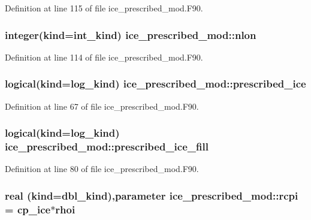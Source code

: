 Definition at line 115 of file ice\_\-prescribed\_\-mod.F90.\hypertarget{namespaceice__prescribed__mod_a7af5d49e5ab6fd7900aeb659387719a3}{
\subsubsection[{nlon}]{\setlength{\rightskip}{0pt plus 5cm}integer(kind=int\_\-kind) {\bf ice\_\-prescribed\_\-mod::nlon}}}
\label{namespaceice__prescribed__mod_a7af5d49e5ab6fd7900aeb659387719a3}


Definition at line 114 of file ice\_\-prescribed\_\-mod.F90.\hypertarget{namespaceice__prescribed__mod_a1b42a8c2b0357eb657332946d2b6c78a}{
\subsubsection[{prescribed\_\-ice}]{\setlength{\rightskip}{0pt plus 5cm}logical(kind=log\_\-kind) {\bf ice\_\-prescribed\_\-mod::prescribed\_\-ice}}}
\label{namespaceice__prescribed__mod_a1b42a8c2b0357eb657332946d2b6c78a}


Definition at line 67 of file ice\_\-prescribed\_\-mod.F90.\hypertarget{namespaceice__prescribed__mod_aa4a8e7410405429c0277535dff2ec7ea}{
\subsubsection[{prescribed\_\-ice\_\-fill}]{\setlength{\rightskip}{0pt plus 5cm}logical(kind=log\_\-kind) {\bf ice\_\-prescribed\_\-mod::prescribed\_\-ice\_\-fill}}}
\label{namespaceice__prescribed__mod_aa4a8e7410405429c0277535dff2ec7ea}


Definition at line 80 of file ice\_\-prescribed\_\-mod.F90.\hypertarget{namespaceice__prescribed__mod_ad7fb751647d1c0fce8353923c934dcd1}{
\subsubsection[{rcpi}]{\setlength{\rightskip}{0pt plus 5cm}real (kind=dbl\_\-kind),parameter {\bf ice\_\-prescribed\_\-mod::rcpi} = cp\_\-ice$\ast$rhoi}}
\label{namespaceice__prescribed__mod_ad7fb751647d1c0fce8353923c934dcd1}


